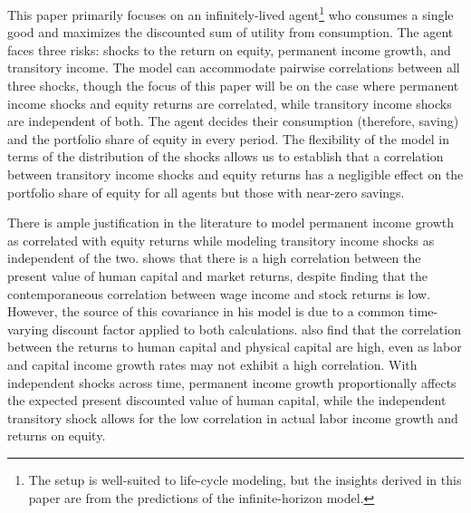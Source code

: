 This paper primarily focuses on an infinitely-lived agent\footnote{The setup is well-suited to life-cycle modeling, but the insights derived in this paper are from the predictions of the infinite-horizon model.} who consumes a single good and maximizes the discounted sum of utility from consumption. The agent faces three risks: shocks to the return on equity, permanent income growth, and transitory income. The model can accommodate pairwise correlations between all three shocks, though the focus of this paper will be on the case where permanent income shocks and equity returns are correlated, while transitory income shocks are independent of both. The agent decides their consumption (therefore, saving) and the portfolio share of equity in every period. The flexibility of the model in terms of the distribution of the shocks allows us to establish that a correlation between transitory income shocks and equity returns has a negligible effect on the portfolio share of equity for all agents but those with near-zero savings.

There is ample justification in the literature to model permanent income growth as correlated with equity returns while modeling transitory income shocks as independent of the two. \citet{Campbell1996} shows that there is a high correlation between the present value of human capital and market returns, despite finding that the contemporaneous correlation between wage income and stock returns is low. However, the source of this covariance in his model is due to a common time-varying discount factor applied to both calculations. \citet{Baxter1997} also find that the correlation between the returns to human capital and physical capital are high, even as labor and capital income growth rates may not exhibit a high correlation. With independent shocks across time, permanent income growth proportionally affects the expected present discounted value of human capital, while the independent transitory shock allows for the low correlation in actual labor income growth and returns on equity.

